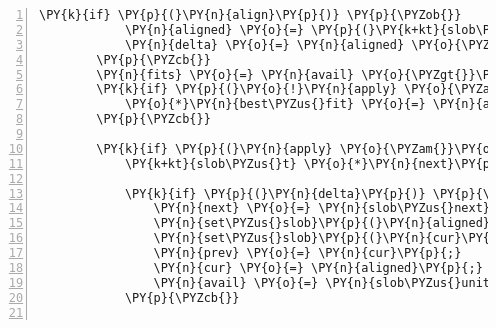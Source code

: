 \begin{Verbatim}[commandchars=\\\{\},numbers=left,firstnumber=1,stepnumber=1]
		\PY{k}{if} \PY{p}{(}\PY{n}{align}\PY{p}{)} \PY{p}{\PYZob{}}
			\PY{n}{aligned} \PY{o}{=} \PY{p}{(}\PY{k+kt}{slob\PYZus{}t} \PY{o}{*}\PY{p}{)}\PY{n}{ALIGN}\PY{p}{(}\PY{p}{(}\PY{k+kt}{unsigned} \PY{k+kt}{long}\PY{p}{)}\PY{n}{cur}\PY{p}{,} \PY{n}{align}\PY{p}{)}\PY{p}{;}
			\PY{n}{delta} \PY{o}{=} \PY{n}{aligned} \PY{o}{\PYZhy{}} \PY{n}{cur}\PY{p}{;}
		\PY{p}{\PYZcb{}}
		\PY{n}{fits} \PY{o}{=} \PY{n}{avail} \PY{o}{\PYZgt{}}\PY{o}{=} \PY{n}{units} \PY{o}{+} \PY{n}{delta}\PY{p}{;}
		\PY{k}{if} \PY{p}{(}\PY{o}{!}\PY{n}{apply} \PY{o}{\PYZam{}}\PY{o}{\PYZam{}} \PY{n}{fits} \PY{o}{\PYZam{}}\PY{o}{\PYZam{}} \PY{p}{(}\PY{o}{!}\PY{o}{*}\PY{n}{best\PYZus{}fit} \PY{o}{|}\PY{o}{|} \PY{p}{(}\PY{n}{avail} \PY{o}{\PYZhy{}} \PY{n}{units} \PY{o}{+} \PY{n}{delta} \PY{o}{\PYZlt{}} \PY{o}{*}\PY{n}{best\PYZus{}fit}\PY{p}{)}\PY{p}{)}\PY{p}{)} \PY{p}{\PYZob{}} \PY{c+cm}{/* room enough? */}
			\PY{o}{*}\PY{n}{best\PYZus{}fit} \PY{o}{=} \PY{n}{avail} \PY{o}{\PYZhy{}} \PY{n}{units} \PY{o}{+} \PY{n}{delta}\PY{p}{;}
		\PY{p}{\PYZcb{}}

		\PY{k}{if} \PY{p}{(}\PY{n}{apply} \PY{o}{\PYZam{}}\PY{o}{\PYZam{}} \PY{n}{fits} \PY{o}{\PYZam{}}\PY{o}{\PYZam{}} \PY{p}{(}\PY{o}{!}\PY{o}{*}\PY{n}{best\PYZus{}fit} \PY{o}{|}\PY{o}{|} \PY{n}{avail} \PY{o}{\PYZhy{}} \PY{n}{units} \PY{o}{+} \PY{n}{delta} \PY{o}{=}\PY{o}{=} \PY{o}{*}\PY{n}{best\PYZus{}fit}\PY{p}{)}\PY{p}{)} \PY{p}{\PYZob{}} \PY{c+cm}{/* room enough? */}
			\PY{k+kt}{slob\PYZus{}t} \PY{o}{*}\PY{n}{next}\PY{p}{;}

			\PY{k}{if} \PY{p}{(}\PY{n}{delta}\PY{p}{)} \PY{p}{\PYZob{}} \PY{c+cm}{/* need to fragment head to align? */}
				\PY{n}{next} \PY{o}{=} \PY{n}{slob\PYZus{}next}\PY{p}{(}\PY{n}{cur}\PY{p}{)}\PY{p}{;}
				\PY{n}{set\PYZus{}slob}\PY{p}{(}\PY{n}{aligned}\PY{p}{,} \PY{n}{avail} \PY{o}{\PYZhy{}} \PY{n}{delta}\PY{p}{,} \PY{n}{next}\PY{p}{)}\PY{p}{;}
				\PY{n}{set\PYZus{}slob}\PY{p}{(}\PY{n}{cur}\PY{p}{,} \PY{n}{delta}\PY{p}{,} \PY{n}{aligned}\PY{p}{)}\PY{p}{;}
				\PY{n}{prev} \PY{o}{=} \PY{n}{cur}\PY{p}{;}
				\PY{n}{cur} \PY{o}{=} \PY{n}{aligned}\PY{p}{;}
				\PY{n}{avail} \PY{o}{=} \PY{n}{slob\PYZus{}units}\PY{p}{(}\PY{n}{cur}\PY{p}{)}\PY{p}{;}
			\PY{p}{\PYZcb{}}


\end{Verbatim}
